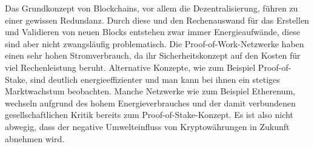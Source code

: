 Das Grundkonzept von Blockchains, vor allem die Dezentralisierung, führen zu einer gewissen Redundanz. Durch diese und den Rechenauswand für das Erstellen und Validieren von neuen Blocks entstehen zwar immer Energieaufwände, diese sind aber nicht zwangsläufig problematisch. Die Proof-of-Work-Netzwerke haben einen sehr hohen Stromverbrauch, da ihr Sicherheitskonzept auf den Kosten für viel Rechenleistung beruht. Alternative Konzepte, wie zum Beispiel Proof-of-Stake, sind deutlich energieeffizienter und man kann bei ihnen ein stetiges Marktwachstum beobachten. Manche Netzwerke wie zum Beispiel Etherenum, wechseln aufgrund des hohem Energieverbrauches und der damit verbundenen gesellschaftlichen Kritik bereits zum Proof-of-Stake-Konzept. Es ist also nicht abwegig, dass der negative Umwelteinfluss von Kryptowährungen in Zukunft abnehmen wird.